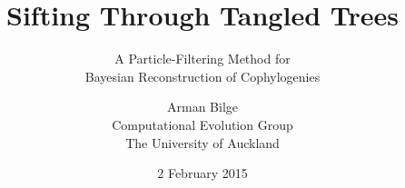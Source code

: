 \documentclass{beamer}
\title{Sifting Through Tangled Trees}
\subtitle{A Particle-Filtering Method for \\ Bayesian Reconstruction of Cophylogenies}
\author{Arman Bilge \\ Computational Evolution Group \\ The University of Auckland}
\date{2 February 2015}
\begin{document}
        \frame{\titlepage}

    
\end{document}
